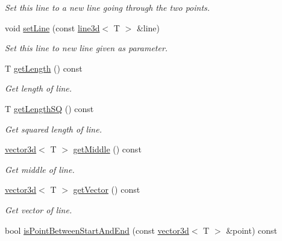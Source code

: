 \begin{DoxyCompactItemize}
\begin{DoxyCompactList}\small\item\em Set this line to a new line going through the two points. \end{DoxyCompactList}\item 
void \hyperlink{classirr_1_1core_1_1line3d_a75d2a9f34ca66c2a1399f8b9fe0fa760}{set\+Line} (const \hyperlink{classirr_1_1core_1_1line3d}{line3d}$<$ T $>$ \&line)\hypertarget{classirr_1_1core_1_1line3d_a75d2a9f34ca66c2a1399f8b9fe0fa760}{}\label{classirr_1_1core_1_1line3d_a75d2a9f34ca66c2a1399f8b9fe0fa760}

\begin{DoxyCompactList}\small\item\em Set this line to new line given as parameter. \end{DoxyCompactList}\item 
T \hyperlink{classirr_1_1core_1_1line3d_abbcbf8958f99c0204c54024322c07a03}{get\+Length} () const 
\begin{DoxyCompactList}\small\item\em Get length of line. \end{DoxyCompactList}\item 
T \hyperlink{classirr_1_1core_1_1line3d_ab5f46ffef60794e9755fc33fdc3a0408}{get\+Length\+SQ} () const 
\begin{DoxyCompactList}\small\item\em Get squared length of line. \end{DoxyCompactList}\item 
\hyperlink{classirr_1_1core_1_1vector3d}{vector3d}$<$ T $>$ \hyperlink{classirr_1_1core_1_1line3d_a2d4f769eb73ef41e3223dc0b2713a759}{get\+Middle} () const 
\begin{DoxyCompactList}\small\item\em Get middle of line. \end{DoxyCompactList}\item 
\hyperlink{classirr_1_1core_1_1vector3d}{vector3d}$<$ T $>$ \hyperlink{classirr_1_1core_1_1line3d_a1394b59b713cec4044259d1999bbcc80}{get\+Vector} () const 
\begin{DoxyCompactList}\small\item\em Get vector of line. \end{DoxyCompactList}\item 
bool \hyperlink{classirr_1_1core_1_1line3d_a1f51d4736b808a665697fba776818239}{is\+Point\+Between\+Start\+And\+End} (const \hyperlink{classirr_1_1core_1_1vector3d}{vector3d}$<$ T $>$ \&point) const 

\end{DoxyCompactItemize}
